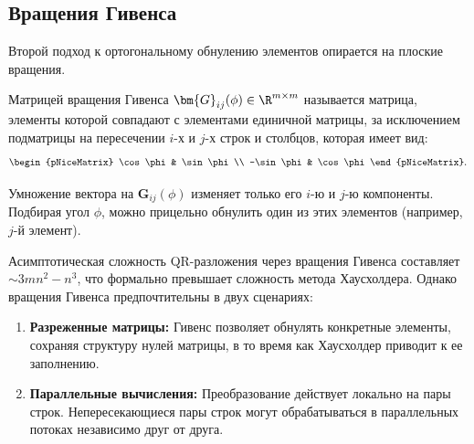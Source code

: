 \subsection{Вращения Гивенса}
\label{sec:givens}

Второй подход к ортогональному обнулению элементов опирается на плоские вращения.

\begin{tcbdefinition}
\label{def:givens}
    Матрицей вращения Гивенса $\bm{G}_{ij}(\phi) \in \R^{m \times m}$ называется матрица, элементы которой совпадают с элементами единичной матрицы, за исключением подматрицы на пересечении $i$-х и $j$-х строк и столбцов, которая имеет вид:
    \begin{equation}
        \begin{pNiceMatrix}
            \cos\phi & \sin\phi \\
            -\sin\phi & \cos\phi
        \end{pNiceMatrix}.
        \label{eq:givens_block}
    \end{equation}
\end{tcbdefinition}

Умножение вектора на $\bm{G}_{ij}(\phi)$ изменяет только его $i$-ю и $j$-ю компоненты. Подбирая угол $\phi$, можно прицельно обнулить один из этих элементов (например, $j$-й элемент). 

\begin{tcbinsight}
    Асимптотическая сложность QR-разложения через вращения Гивенса составляет $\sim 3mn^2 - n^3$, что формально превышает сложность метода Хаусхолдера. Однако вращения Гивенса предпочтительны в двух сценариях:
    \begin{enumerate}
        \item \textbf{Разреженные матрицы:} Гивенс позволяет обнулять конкретные элементы, сохраняя структуру нулей матрицы, в то время как Хаусхолдер приводит к ее заполнению.
        \item \textbf{Параллельные вычисления:} Преобразование действует локально на пары строк. Непересекающиеся пары строк могут обрабатываться в параллельных потоках независимо друг от друга.
    \end{enumerate}
\end{tcbinsight}

